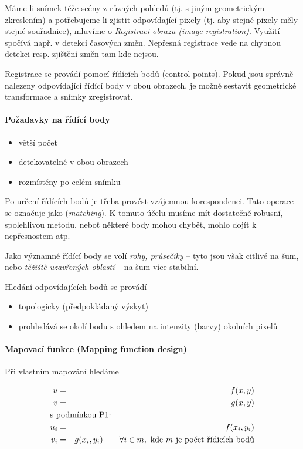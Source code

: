 Máme-li snímek téže scény z různých pohledů (tj. s jiným geometrickým zkreslením) a potřebujeme-li zjistit odpovídající
pixely (tj. aby stejné pixely měly stejné souřadnice), mluvíme o {\em Registraci obrazu (image registration)}. Využití
spočívá např. v detekci časových změn. Nepřesná registrace vede na chybnou detekci resp. zjištění změn tam kde nejsou.

Registrace se provádí pomocí řídících bodů (control points). Pokud jsou správně nalezeny odpovídající řídící body v obou
obrazech, je možné sestavit geometrické transformace a snímky zregistrovat.

\paragraph{Požadavky na řídící body}

\begin{itemize}
\item větší počet
\item detekovatelné v obou obrazech
\item rozmístěny po celém snímku
\end{itemize}

Po určení řídících bodů je třeba provést vzájemnou korespondenci. Tato operace se označuje jako ({\em matching}). 
K tomuto účelu musíme mít dostatečně robusní, spolehlivou metodu, neboť některé body mohou chybět, mohlo dojít
k nepřesnostem atp. 

Jako významné řídící body se volí {\em rohy, průsečíky} -- tyto jsou však citlivé na šum, nebo {\em těžiště uzavřených 
oblastí} -- na šum více stabilní.

Hledání odpovídajících bodů se provádí
\begin{itemize} 
\item topologicky (předpokládaný výskyt)
\item prohledává se okolí bodu s ohledem na intenzity (barvy) okolních pixelů
\end{itemize}

\paragraph{Mapovací funkce (Mapping function design)}

Při vlastním mapování hledáme

\begin{eqnarray}
u&=&f(x,y)\\
v&=&g(x,y)\\
\noalign{\hbox{s podmínkou P1:}\nonumber}
u_i&=&f(x_i,y_i)\\
v_i&=&g(x_i,y_i)\qquad\forall i\in m,\ \hbox{kde $m$ je počet řídících bodů}
\end{eqnarray}

